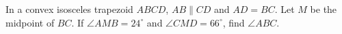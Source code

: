 In a convex isosceles trapezoid $ABCD$, $AB\parallel CD$ and $AD=BC$. Let $M$ be the midpoint of $BC$. If $\angle AMB=24^\circ$ and $\angle CMD=66^\circ$, find $\angle ABC$.
